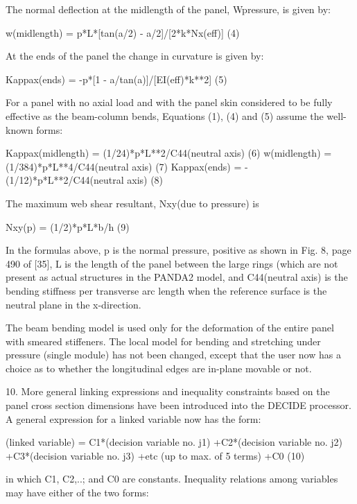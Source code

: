 The normal deflection at the midlength of the panel, Wpressure, is given
by: 

        w(midlength) = p*L*[tan(a/2) - a/2]/[2*k*Nx(eff)]      (4)

At the ends of the panel the change in curvature is given by:

         Kappax(ends) = -p*[1 - a/tan(a)]/[EI(eff)*k**2]       (5)  
 
For a panel with no axial load and with the panel skin considered to be
fully effective as the beam-column bends, Equations (1), (4) and (5)
assume the well-known forms: 

     Kappax(midlength) =  (1/24)*p*L**2/C44(neutral axis)      (6)
     w(midlength)      = (1/384)*p*L**4/C44(neutral axis)      (7)
     Kappax(ends)      = -(1/12)*p*L**2/C44(neutral axis)      (8)

The maximum web shear resultant, Nxy(due to pressure) is

         Nxy(p) = (1/2)*p*L*b/h                                (9)

In the formulas above, p is the normal pressure, positive as shown in Fig.
8, page 490 of [35], L is the length of the panel between the large rings
(which are not present as actual structures in the PANDA2 model, and
C44(neutral axis) is the bending stiffness per transverse arc length when
the reference surface is the neutral plane in the x-direction. 
 
The beam bending model is used only for the deformation of the entire
panel with smeared stiffeners. The local model for bending and stretching
under pressure (single module) has not been changed, except that the user
now has a choice as to whether the longitudinal edges are in-plane movable
or not. 


10. More general linking expressions and inequality constraints based on
the panel cross section dimensions have been introduced into the DECIDE
processor. A general expression for a linked variable now has the form: 
   
       (linked variable)  =  C1*(decision variable no. j1)
                            +C2*(decision variable no. j2)
                            +C3*(decision variable no. j3)
                            +etc (up to max. of 5 terms)
                            +C0                                   (10)
 
in which C1, C2,..;  and C0 are constants.  Inequality relations among
variables may have either of the two forms: 

